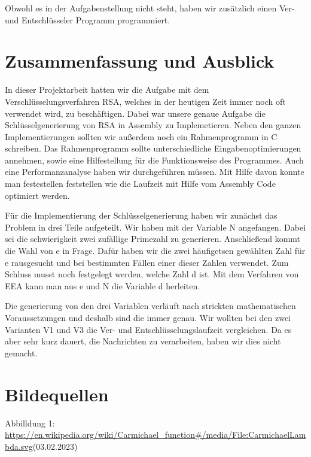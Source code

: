 \documentclass[course=asp]{aspdoc}
\begin{document}
Obwohl es in der Aufgabenstellung nicht steht, haben wir zusätzlich einen Ver- und Entschlüsseler Programm programmiert. 


\section{Zusammenfassung und Ausblick}
In dieser Projektarbeit hatten wir die Aufgabe mit dem Verschlüsselungsverfahren RSA, welches in der heutigen Zeit immer noch oft verwendet wird, zu beschäftigen. Dabei war unsere genaue Aufgabe die Schlüsselgenerierung von RSA in Assembly zu Implemetieren. Neben den ganzen Implementierungen sollten wir außerdem noch ein Rahmenprogramm in C schreiben. Das Rahmenprogramm sollte unterschiedliche Eingabenoptimierungen annehmen, sowie eine Hilfestellung für die Funktionsweise des Programmes. Auch eine Performanzanalyse haben wir durchgeführen müssen. Mit Hilfe davon konnte man festestellen feststellen wie die Laufzeit mit Hilfe vom Assembly Code optimiert werden. 

Für die Implementierung der Schlüsselgenerierung haben wir zunächst das Problem in drei Teile aufgeteilt. Wir haben mit der Variable N angefangen. Dabei sei die schwierigkeit zwei zufällige Primezahl zu generieren. Anschließend kommt die Wahl von e in Frage. Dafür haben wir die zwei häufigetsen gewählten Zahl für e rausgesucht und bei bestimmten Fällen einer dieser Zahlen verwendet. Zum Schluss musst noch festgelegt werden, welche Zahl d ist. Mit dem Verfahren von EEA kann man aus e und N die Variable d herleiten. 

Die generierung von den drei Variablen verläuft nach strickten mathematischen Voraussetzungen und deshalb sind die immer genau. Wir wollten bei den zwei Varianten V1 und V3 die Ver- und Entschlüsselungslaufzeit vergleichen. Da es aber sehr kurz dauert, die Nachrichten zu verarbeiten, haben wir dies nicht gemacht.

\section{Bildequellen}
Abbilldung 1: \url{https://en.wikipedia.org/wiki/Carmichael_function#/media/File:CarmichaelLambda.svg}(03.02.2023)


{}
\end{document}
